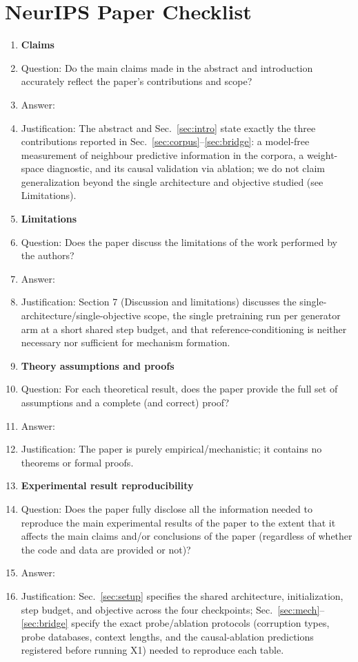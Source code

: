 \section*{NeurIPS Paper Checklist}

\begin{enumerate}

\item {\bf Claims}
    \item[] Question: Do the main claims made in the abstract and introduction accurately reflect the paper's contributions and scope?
    \item[] Answer: \answerYes{}
    \item[] Justification: The abstract and Sec.~\ref{sec:intro} state exactly the three contributions reported in Sec.~\ref{sec:corpus}--\ref{sec:bridge}: a model-free measurement of neighbour predictive information in the corpora, a weight-space diagnostic, and its causal validation via ablation; we do not claim generalization beyond the single architecture and objective studied (see Limitations).

\item {\bf Limitations}
    \item[] Question: Does the paper discuss the limitations of the work performed by the authors?
    \item[] Answer: \answerYes{}
    \item[] Justification: Section 7 (Discussion and limitations) discusses the single-architecture/single-objective scope, the single pretraining run per generator arm at a short shared step budget, and that reference-conditioning is neither necessary nor sufficient for mechanism formation.

\item {\bf Theory assumptions and proofs}
    \item[] Question: For each theoretical result, does the paper provide the full set of assumptions and a complete (and correct) proof?
    \item[] Answer: \answerNA{}
    \item[] Justification: The paper is purely empirical/mechanistic; it contains no theorems or formal proofs.

\item {\bf Experimental result reproducibility}
    \item[] Question: Does the paper fully disclose all the information needed to reproduce the main experimental results of the paper to the extent that it affects the main claims and/or conclusions of the paper (regardless of whether the code and data are provided or not)?
    \item[] Answer: \answerYes{}
    \item[] Justification: Sec.~\ref{sec:setup} specifies the shared architecture, initialization, step budget, and objective across the four checkpoints; Sec.~\ref{sec:mech}--\ref{sec:bridge} specify the exact probe/ablation protocols (corruption types, probe databases, context lengths, and the causal-ablation predictions registered before running X1) needed to reproduce each table.


\end{enumerate}
